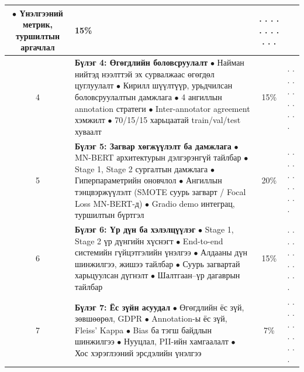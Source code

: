 \begin{titlepage}
\begin{center}
{\begin{tabular}{|c|p{7.8cm}|c|p{2.2cm}|}
\newline $\bullet$ Үнэлгээний метрик, туршилтын аргачлал & 15\% & . . . . . . . . . . . \\ \hline
4 & \textbf{Бүлэг 4: Өгөгдлийн боловсруулалт}
\newline $\bullet$ Найман нийтэд нээлттэй эх сурвалжаас өгөгдөл цуглуулалт
\newline $\bullet$ Кирилл шүүлтүүр, урьдчилсан боловсруулалтын дамжлага
\newline $\bullet$ 4 ангиллын annotation стратеги
\newline $\bullet$ Inter-annotator agreement хэмжилт
\newline $\bullet$ 70/15/15 харьцаатай train/val/test хуваалт & 15\% & . . . . . . . . . . . \\ \hline
5 & \textbf{Бүлэг 5: Загвар хөгжүүлэлт ба дамжлага}
\newline $\bullet$ MN-BERT архитектурын дэлгэрэнгүй тайлбар
\newline $\bullet$ Stage 1, Stage 2 сургалтын дамжлага
\newline $\bullet$ Гиперпараметрийн оновчлол
\newline $\bullet$ Ангиллын тэнцвэржүүлэлт (SMOTE суурь загварт / Focal Loss MN-BERT-д)
\newline $\bullet$ Gradio demo интеграц, туршилтын бүртгэл & 20\% & . . . . . . . . . . . \\ \hline
6 & \textbf{Бүлэг 6: Үр дүн ба хэлэлцүүлэг}
\newline $\bullet$ Stage 1, Stage 2 үр дүнгийн хүснэгт
\newline $\bullet$ End-to-end системийн гүйцэтгэлийн үнэлгээ
\newline $\bullet$ Алдааны дүн шинжилгээ, жишээ тайлбар
\newline $\bullet$ Суурь загвартай харьцуулсан дүгнэлт
\newline $\bullet$ Шалтгаан--үр дагаврын тайлбар & 15\% & . . . . . . . . . . . \\ \hline
7 & \textbf{Бүлэг 7: Ёс зүйн асуудал}
\newline $\bullet$ Өгөгдлийн ёс зүй, зөвшөөрөл, GDPR
\newline $\bullet$ Annotation-ы ёс зүй, Fleiss' Kappa
\newline $\bullet$ Bias ба тэгш байдлын шинжилгээ
\newline $\bullet$ Нууцлал, PII-ийн хамгаалалт
\newline $\bullet$ Хос хэрэглээний эрсдэлийн үнэлгээ & 7\% & . . . . . . . . . . . \\ \hline

\end{tabular}}
\end{center}
\end{titlepage}
